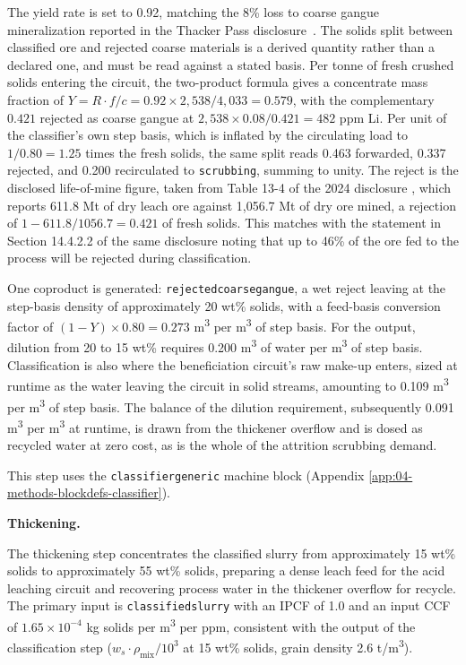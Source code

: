 \documentclass{article}
\renewcommand\_{\textunderscore\allowbreak}
\begin{document}
The yield rate is set to 0.92, matching the 8\% loss to coarse gangue mineralization reported in the Thacker Pass disclosure~\cite{sgscanadaincSK1300Technical2024}. The solids split between classified ore and rejected coarse materials is a derived quantity rather than a declared one, and must be read against a stated basis. Per tonne of fresh crushed solids entering the circuit, the two-product formula gives a concentrate mass fraction of $Y=R \cdot f/c=0.92 \times 2,538/4,033=0.579$, with the complementary $0.421$ rejected as coarse gangue at $2,538 \times 0.08/0.421=482$ ppm Li. Per unit of the classifier's own step basis, which is inflated by the circulating load to $1/0.80=1.25$ times the fresh solids, the same split reads 0.463 forwarded, 0.337 rejected, and 0.200 recirculated to \texttt{scrubbing}, summing to unity. The reject is the disclosed life-of-mine figure, taken from Table 13-4 of the 2024 disclosure \cite{sgscanadaincSK1300Technical2024}, which reports 611.8 Mt of dry leach ore against 1,056.7 Mt of dry ore mined, a rejection of $1-611.8/1056.7=0.421$ of fresh solids. This matches with the statement in Section 14.4.2.2 of the same disclosure noting that up to 46\% of the ore fed to the process will be rejected during classification. 

One coproduct is generated: \texttt{rejected\_coarse\_gangue}, a wet reject leaving at the step-basis density of approximately 20 wt\% solids, with a feed-basis conversion factor of $(1-Y) \times 0.80=0.273$ \si{m^3} per \si{m^3} of step basis. For the output, dilution from 20 to 15 wt\% requires 0.200 \si{m^3} of water per \si{m^3} of step basis. Classification is also where the beneficiation circuit's raw make-up enters, sized at runtime as the water leaving the circuit in solid streams, amounting to 0.109 \si{m^3} per \si{m^3} of step basis. The balance of the dilution requirement, subsequently 0.091 \si{m^3} per \si{m^3} at runtime, is drawn from the thickener overflow and is dosed as recycled water at zero cost, as is the whole of the attrition scrubbing demand. 

This step uses the \texttt{classifier\_generic} machine block (Appendix \ref{app:04-methods-blockdefs-classifier}).

\medskip
\noindent\textbf{Thickening.}\quad

The thickening step concentrates the classified slurry from approximately 15 wt\% solids to approximately 55 wt\% solids, preparing a dense leach feed for the acid leaching circuit and recovering process water in the thickener overflow for recycle. The primary input is \texttt{classified\_slurry} with an IPCF of 1.0 and an input CCF of $1.65 \times 10^{-4}$ kg solids per \si{m^3} per ppm, consistent with the output of the classification step ($w_s \cdot \rho_{\text{mix}} / 10^3$ at 15 wt\% solids, grain density 2.6 \si{t/m^3}).
\end{document}
